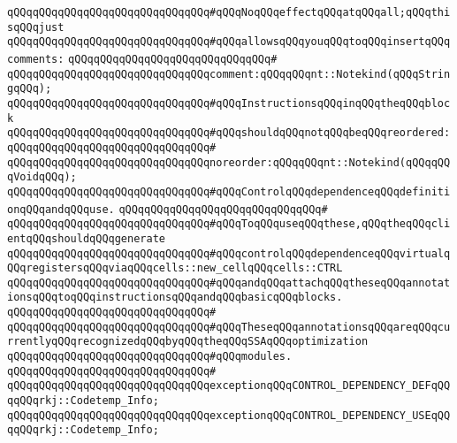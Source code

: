 \newline
\verb|qQQqqQQqqQQqqQQqqQQqqQQqqQQqqQQq#qQQqNoqQQqeffectqQQqatqQQqall;qQQqthisqQQqjust|\newline
\verb|qQQqqQQqqQQqqQQqqQQqqQQqqQQqqQQq#qQQqallowsqQQqyouqQQqtoqQQqinsertqQQqcomments:|\newline
\verb|qQQqqQQqqQQqqQQqqQQqqQQqqQQqqQQq#|\newline
\verb|qQQqqQQqqQQqqQQqqQQqqQQqqQQqqQQqcomment:qQQqqQQqnt::Notekind(qQQqStringqQQq);|\newline
\newline
\verb|qQQqqQQqqQQqqQQqqQQqqQQqqQQqqQQq#qQQqInstructionsqQQqinqQQqtheqQQqblock|\newline
\verb|qQQqqQQqqQQqqQQqqQQqqQQqqQQqqQQq#qQQqshouldqQQqnotqQQqbeqQQqreordered:|\newline
\verb|qQQqqQQqqQQqqQQqqQQqqQQqqQQqqQQq#|\newline
\verb|qQQqqQQqqQQqqQQqqQQqqQQqqQQqqQQqnoreorder:qQQqqQQqnt::Notekind(qQQqqQQqVoidqQQq);|\newline
\newline
\newline
\verb|qQQqqQQqqQQqqQQqqQQqqQQqqQQqqQQq#qQQqControlqQQqdependenceqQQqdefinitionqQQqandqQQquse.|\newline
\verb|qQQqqQQqqQQqqQQqqQQqqQQqqQQqqQQq#|\newline
\verb|qQQqqQQqqQQqqQQqqQQqqQQqqQQqqQQq#qQQqToqQQquseqQQqthese,qQQqtheqQQqclientqQQqshouldqQQqgenerate|\newline
\verb|qQQqqQQqqQQqqQQqqQQqqQQqqQQqqQQq#qQQqcontrolqQQqdependenceqQQqvirtualqQQqregistersqQQqviaqQQqcells::new_cellqQQqcells::CTRL|\newline
\verb|qQQqqQQqqQQqqQQqqQQqqQQqqQQqqQQq#qQQqandqQQqattachqQQqtheseqQQqannotationsqQQqtoqQQqinstructionsqQQqandqQQqbasicqQQqblocks.|\newline
\verb|qQQqqQQqqQQqqQQqqQQqqQQqqQQqqQQq#|\newline
\verb|qQQqqQQqqQQqqQQqqQQqqQQqqQQqqQQq#qQQqTheseqQQqannotationsqQQqareqQQqcurrentlyqQQqrecognizedqQQqbyqQQqtheqQQqSSAqQQqoptimization|\newline
\verb|qQQqqQQqqQQqqQQqqQQqqQQqqQQqqQQq#qQQqmodules.|\newline
\verb|qQQqqQQqqQQqqQQqqQQqqQQqqQQqqQQq#|\newline
\verb|qQQqqQQqqQQqqQQqqQQqqQQqqQQqqQQqexceptionqQQqCONTROL_DEPENDENCY_DEFqQQqqQQqrkj::Codetemp_Info;|\newline
\verb|qQQqqQQqqQQqqQQqqQQqqQQqqQQqqQQqexceptionqQQqCONTROL_DEPENDENCY_USEqQQqqQQqrkj::Codetemp_Info;|\newline
